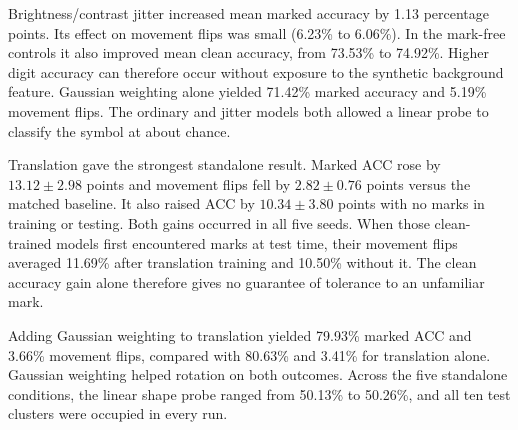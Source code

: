 Brightness/contrast jitter increased mean marked accuracy by 1.13 percentage points. Its effect on movement flips was small (6.23\% to 6.06\%). In the mark-free controls it also improved mean clean accuracy, from 73.53\% to 74.92\%. Higher digit accuracy can therefore occur without exposure to the synthetic background feature. Gaussian weighting alone yielded 71.42\% marked accuracy and 5.19\% movement flips. The ordinary and jitter models both allowed a linear probe to classify the symbol at about chance.

Translation gave the strongest standalone result. Marked ACC rose by $13.12\pm2.98$ points and movement flips fell by $2.82\pm0.76$ points versus the matched baseline. It also raised ACC by $10.34\pm3.80$ points with no marks in training or testing. Both gains occurred in all five seeds. When those clean-trained models first encountered marks at test time, their movement flips averaged 11.69\% after translation training and 10.50\% without it. The clean accuracy gain alone therefore gives no guarantee of tolerance to an unfamiliar mark.

Adding Gaussian weighting to translation yielded 79.93\% marked ACC and 3.66\% movement flips, compared with 80.63\% and 3.41\% for translation alone. Gaussian weighting helped rotation on both outcomes. Across the five standalone conditions, the linear shape probe ranged from 50.13\% to 50.26\%, and all ten test clusters were occupied in every run.
